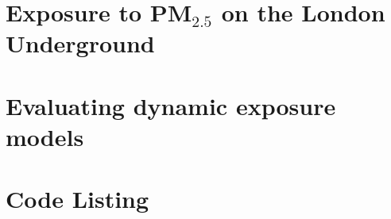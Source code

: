 \documentclass[12pt]{report}
\begin{document}
\chapter{Exposure to \texorpdfstring{PM$_{2.5}$}{} on the London Underground}
\label{chap:monitoring_on_underground}


\chapter{Evaluating dynamic exposure models}





\appendix

\chapter{Code Listing}

\end{document}
